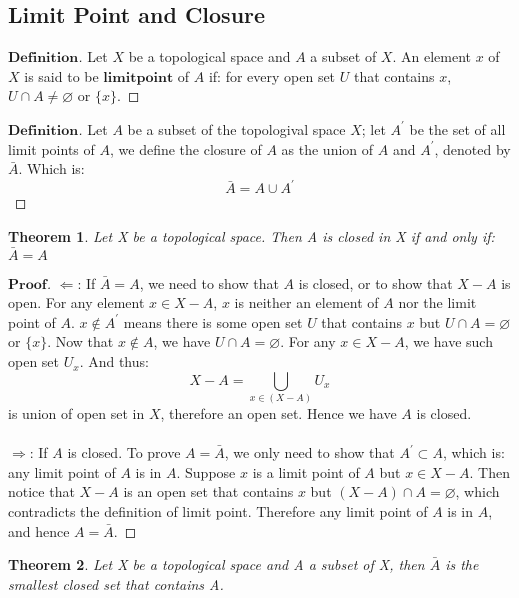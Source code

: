 \documentclass[a4paper, 11pt]{article}
\newtheorem{theorem}{Theorem}
\theoremstyle{remark}
\newenvironment{myprf}
{\renewcommand\qedsymbol{$ $}\begin{proof}[$\mathbf{Proof}$]}
  {\end{proof}}
\newenvironment{mydef}
{\renewcommand\qedsymbol{$ $}\begin{proof}[$\mathbf{Definition}$]}
  {\end{proof}}
\theoremstyle{definition}
\begin{document}
\subsection{Limit Point and Closure}
\begin{mydef}
    Let $X$ be a topological space and $A$ a subset of $X$. An element $x$ of $X$
    is said to be $\bm{limit point}$ of $A$ if: for every open set $U$ that 
    contains $x$, $U\cap A\neq \varnothing$ or $\{x\}$.
\end{mydef}
\begin{mydef}
        Let $A$ be a subset of the topologival space $X$; let $A^{'}$ be the set
        of all limit points of $A$, we define the closure of $A$ as the union
        of $A$ and $A^{'}$, denoted by $\bar{A}$. Which is:
        $$
        \bar{A}=A\cup A^{'}
        $$
\end{mydef}
\begin{theorem}
    Let X be a topological space. Then A is closed in  X if and only if:$\bar{A}=A$
\end{theorem}
\begin{myprf}
        $\Leftarrow$: If $\bar{A}=A$, we need to show that $A$ is closed, or to
        show that
        $X-A$ is open. For any element $x\in X-A$, $x$ is neither an element of
        $A$ nor the limit point of $A$. $x\notin A^{'}$ means there is some 
        open set $U$ that contains $x$ but $U\cap A=\varnothing$ or
        $\{x\}$. Now that $x\notin A$, we have $U\cap A=\varnothing$. For any
        $x\in X-A$, we have such open set $U_x$. And thus:
        $$
        X-A=\bigcup_{x\in (X-A)} U_x
        $$ is union of open set in $X$, therefore an open set. Hence we have $A$
        is closed.\\
        \\
        $\Rightarrow$: If $A$ is closed. To prove $A=\bar{A}$, we only need to 
        show that $A^{'}\subset A$, which is: any limit point of $A$ is in $A$.
        Suppose $x$ is a limit point of $A$ but $x\in X-A$. Then notice that $X-A$ is
        an open set that contains $x$ but $(X-A)\cap A=\varnothing$, which 
        contradicts the definition of limit point. Therefore any limit point of 
        $A$ is in $A$, and hence $A=\bar{A}$.
\end{myprf}
\vspace{0.5cm}
\begin{theorem}
        Let X be a topological space and A a subset of X, then $\bar{A}$ is the
        smallest closed set that contains A.
\end{theorem}
\end{document}
